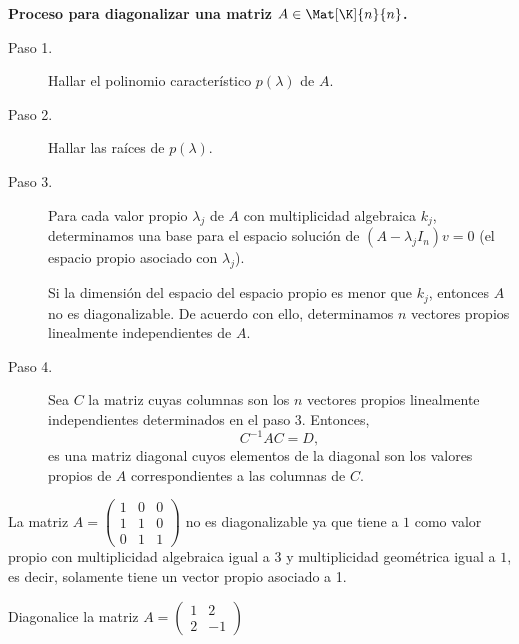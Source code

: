 \documentclass[compacto,10pt]{pubciencias-notas}
\begin{document}


\begin{advertencia}
\textbf{Proceso para diagonalizar una matriz $A\in\Mat[\K]{n}{n}$.}

\begin{description}
    \item[Paso 1.] Hallar el polinomio característico $p(\lambda)$ de $A$.
    \item[Paso 2.] Hallar las raíces de $p(\lambda)$.
    \item[Paso 3.] Para cada valor propio $\lambda_{j}$ de $A$ con multiplicidad algebraica $k_{j}$, determinamos una base para el espacio solución de $(A - \lambda_{j} I_{n})v = 0$ (el espacio propio asociado con $\lambda_{j}$).
    
    Si la dimensión del espacio del espacio propio es menor que $k_{j}$, entonces $A$ no es diagonalizable. De acuerdo con ello, determinamos $n$ vectores propios linealmente independientes de $A$.
    \item[Paso 4.] Sea $C$ la matriz cuyas columnas son los $n$ vectores propios linealmente independientes determinados en el paso 3. Entonces, 
    \[  
        C^{-1}AC = D,
    \]
    es una matriz diagonal cuyos elementos de la diagonal son los valores propios de $A$ correspondientes a las columnas de $C$.
\end{description}
\end{advertencia}

\begin{ejem}\hspace{0pt} La matriz $A=\begin{pmatrix}1&0&0\\1&1&0\\0&1&1\end{pmatrix}$ no es diagonalizable ya que tiene a $1$ como valor propio con multiplicidad algebraica igual a $3$ y multiplicidad geométrica igual a $1$, es decir, solamente tiene un vector propio asociado a 1.
\end{ejem}

\begin{ejer}
Diagonalice la matriz $
A=\begin{pmatrix}
1&2\\
2&-1
\end{pmatrix}
$
\end{ejer}
\end{document}
